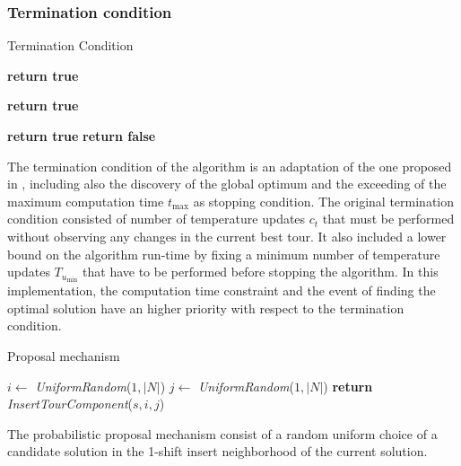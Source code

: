 \begin{homeworkProblem}
\subsubsection{Termination condition}
\begin{algorithm}[!h]
  \caption{Termination Condition}\label{SA:Term}
  \begin{algorithmic}[1]
				      \State \textbf{return true}
			 \EndIf
			  
				      \State \textbf{return true}
			  \EndIf
       
			      
				      \State \textbf{return true}
			      \EndIf
			\Else    
        \State \textbf{return false}
      \EndIf
    \EndProcedure
\end{algorithmic}
\end{algorithm}

The termination condition of the algorithm is an adaptation of the one proposed in \cite{ohlmann2007compressed}, including also the discovery of the global optimum and the exceeding of the maximum computation time $t_{\max}$ as stopping condition.
The original termination condition consisted of number of temperature updates $c_t$ that must be performed without observing any changes in the current best tour.
It also included a lower bound on the algorithm run-time by fixing a minimum number of temperature updates $T_{u_{\min}}$ that have to be performed before stopping the algorithm.
In this implementation, the computation time constraint and the event of finding the optimal solution have an higher priority with respect to the termination condition.

\begin{algorithm}
\caption{Proposal mechanism}
\label{SA:Prop}
\begin{algorithmic}
  \State $i \gets $ \emph{UniformRandom}($1,|N|$)
    \State $j \gets $ \emph{UniformRandom}($1,|N|$)
  \EndWhile  
  \State \textbf{return} \emph{InsertTourComponent}($s,i,j$)   
\EndProcedure
\end{algorithmic}
\end{algorithm}

The probabilistic proposal mechanism consist of a random uniform choice of a candidate solution in the 1-shift insert neighborhood of the current solution.


\end{homeworkProblem}
